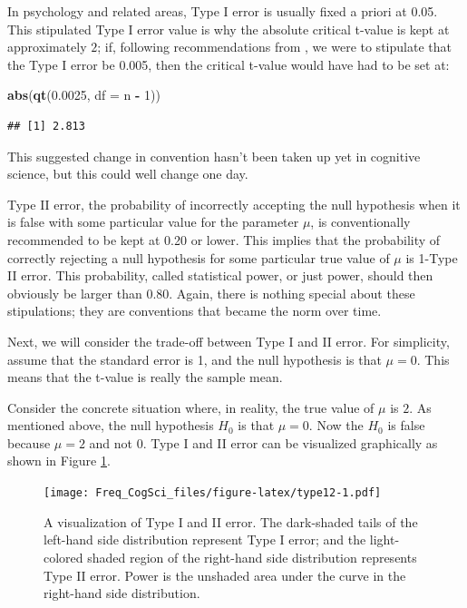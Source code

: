 \documentclass[12pt,]{krantz}
\newenvironment{Shaded}{\begin{snugshade}}{\end{snugshade}}
\newcommand{\DataTypeTok}[1]{\textcolor[rgb]{0.13,0.29,0.53}{#1}}
\newcommand{\DecValTok}[1]{\textcolor[rgb]{0.00,0.00,0.81}{#1}}
\newcommand{\FloatTok}[1]{\textcolor[rgb]{0.00,0.00,0.81}{#1}}
\newcommand{\KeywordTok}[1]{\textcolor[rgb]{0.13,0.29,0.53}{\textbf{#1}}}
\newcommand{\NormalTok}[1]{#1}
\newcommand{\OperatorTok}[1]{\textcolor[rgb]{0.81,0.36,0.00}{\textbf{#1}}}
\newcommand{\StringTok}[1]{\textcolor[rgb]{0.31,0.60,0.02}{#1}}
\begin{document}
In psychology and related areas, Type I error is usually fixed a priori at 0.05. This stipulated Type I error value is why the absolute critical t-value is kept at approximately \(2\); if, following recommendations from \citet{benjamin2018redefine}, we were to stipulate that the Type I error be 0.005, then the critical t-value would have had to be set at:

\begin{Shaded}
\begin{Highlighting}[]
\KeywordTok{abs}\NormalTok{(}\KeywordTok{qt}\NormalTok{(}\FloatTok{0.0025}\NormalTok{, }\DataTypeTok{df =}\NormalTok{ n }\OperatorTok{-}\StringTok{ }\DecValTok{1}\NormalTok{))}
\end{Highlighting}
\end{Shaded}

\begin{verbatim}
## [1] 2.813
\end{verbatim}

This suggested change in convention hasn't been taken up yet in cognitive science, but this could well change one day.

Type II error, the probability of incorrectly accepting the null hypothesis when it is false with some particular value for the parameter \(\mu\), is conventionally recommended \citep{powerbookcohen} to be kept at 0.20 or lower. This implies that the probability of correctly rejecting a null hypothesis for some particular true value of \(\mu\) is 1-Type II error. This probability, called statistical power, or just power, should then obviously be larger than 0.80. Again, there is nothing special about these stipulations; they are conventions that became the norm over time.

Next, we will consider the trade-off between Type I and II error. For simplicity, assume that the standard error is 1, and the null hypothesis is that \(\mu=0\). This means that the t-value is really the sample mean.

Consider the concrete situation where, in reality, the true value of \(\mu\) is \(2\). As mentioned above, the null hypothesis \(H_0\) is that \(\mu=0\). Now the \(H_0\) is false because \(\mu=2\) and not \(0\). Type I and II error can be visualized graphically as shown in Figure \ref{fig:type12}.

\begin{figure}
\centering
\texttt{[image: Freq\_CogSci\_files/figure-latex/type12-1.pdf]}
\caption{\label{fig:type12}A visualization of Type I and II error. The dark-shaded tails of the left-hand side distribution represent Type I error; and the light-colored shaded region of the right-hand side distribution represents Type II error. Power is the unshaded area under the curve in the right-hand side distribution.}
\end{figure}
\end{document}
